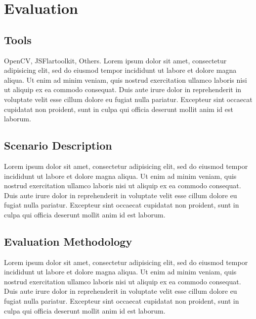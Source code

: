 \chapter{Evaluation} %
\label{cha:evaluation}

\section{Tools} %
\label{sec:evaluation:tools}

OpenCV, JSFlartoolkit, Others.
Lorem ipsum dolor sit amet, consectetur adipisicing elit, sed do eiusmod
tempor incididunt ut labore et dolore magna aliqua. Ut enim ad minim veniam,
quis nostrud exercitation ullamco laboris nisi ut aliquip ex ea commodo
consequat. Duis aute irure dolor in reprehenderit in voluptate velit esse
cillum dolore eu fugiat nulla pariatur. Excepteur sint occaecat cupidatat non
proident, sunt in culpa qui officia deserunt mollit anim id est laborum.


\section{Scenario Description} %
\label{sec:evaluation:scenario_description}

Lorem ipsum dolor sit amet, consectetur adipisicing elit, sed do eiusmod
tempor incididunt ut labore et dolore magna aliqua. Ut enim ad minim veniam,
quis nostrud exercitation ullamco laboris nisi ut aliquip ex ea commodo
consequat. Duis aute irure dolor in reprehenderit in voluptate velit esse
cillum dolore eu fugiat nulla pariatur. Excepteur sint occaecat cupidatat non
proident, sunt in culpa qui officia deserunt mollit anim id est laborum.


\section{Evaluation Methodology} %
\label{sec:evaluation:evaluation_methodology}

Lorem ipsum dolor sit amet, consectetur adipisicing elit, sed do eiusmod
tempor incididunt ut labore et dolore magna aliqua. Ut enim ad minim veniam,
quis nostrud exercitation ullamco laboris nisi ut aliquip ex ea commodo
consequat. Duis aute irure dolor in reprehenderit in voluptate velit esse
cillum dolore eu fugiat nulla pariatur. Excepteur sint occaecat cupidatat non
proident, sunt in culpa qui officia deserunt mollit anim id est laborum.

